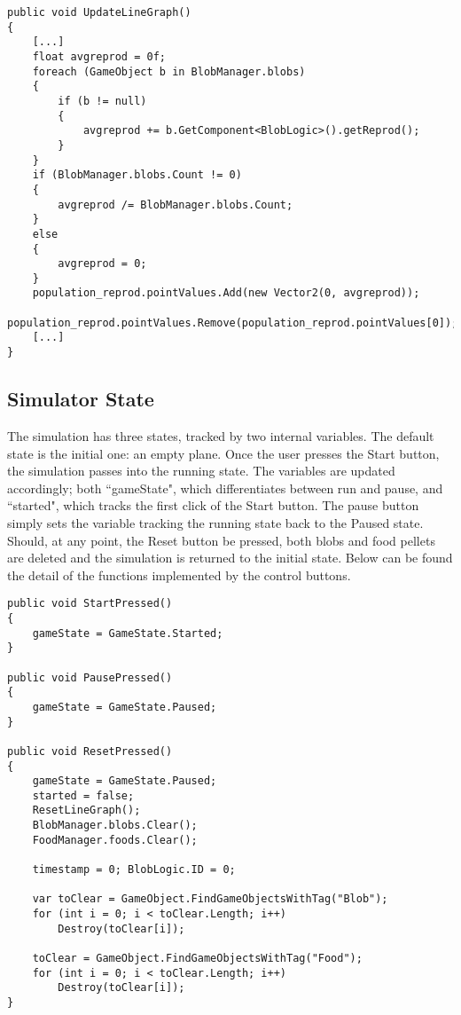 \begin{lstlisting}
public void UpdateLineGraph()
{
    [...]
    float avgreprod = 0f;
    foreach (GameObject b in BlobManager.blobs)
    {
        if (b != null)
        {
            avgreprod += b.GetComponent<BlobLogic>().getReprod();
        }
    }
    if (BlobManager.blobs.Count != 0)
    {
        avgreprod /= BlobManager.blobs.Count;
    }
    else
    {
        avgreprod = 0;
    }
    population_reprod.pointValues.Add(new Vector2(0, avgreprod));
    population_reprod.pointValues.Remove(population_reprod.pointValues[0]);
    [...]
}
\end{lstlisting}
	
\subsection{Simulator State}
The simulation has three states, tracked by two internal variables. The default state is the initial one: an empty plane. Once the user presses the Start button, the simulation passes into the running state. The variables are updated accordingly; both ``gameState", which differentiates between run and pause, and ``started", which tracks the first click of the Start button. The pause button simply sets the variable tracking the running state back to the Paused state. Should, at any point, the Reset button be pressed, both blobs and food pellets are deleted and the simulation is returned to the initial state. Below can be found the detail of the functions implemented by the control buttons.

\begin{lstlisting}
public void StartPressed()
{
    gameState = GameState.Started;
}
	    
public void PausePressed()
{
    gameState = GameState.Paused;
}
	    
public void ResetPressed()
{
    gameState = GameState.Paused;
    started = false;
    ResetLineGraph();
    BlobManager.blobs.Clear();
    FoodManager.foods.Clear();
    	
    timestamp = 0; BlobLogic.ID = 0;	

    var toClear = GameObject.FindGameObjectsWithTag("Blob");
    for (int i = 0; i < toClear.Length; i++)
        Destroy(toClear[i]);

    toClear = GameObject.FindGameObjectsWithTag("Food");
    for (int i = 0; i < toClear.Length; i++)
        Destroy(toClear[i]);
}
\end{lstlisting}

